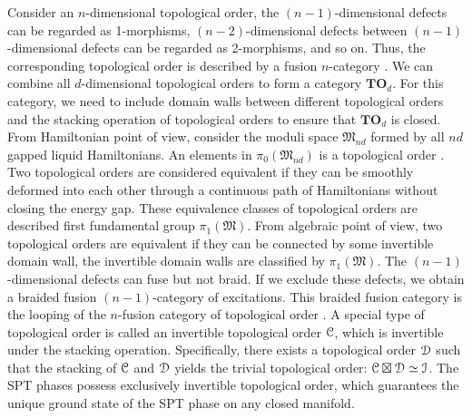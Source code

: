 \documentclass[a4paper,11pt]{article}
\theoremstyle{theorem}
\theoremstyle{remark}
\newcommand\eC           {\EuScript{C}}
\newcommand\eD           {\EuScript{D}}
\newcommand\eI           {\EuScript{I}}
\begin{document}
Consider an \( n \)-dimensional topological order,
the $(n-1)$-dimensional defects can be regarded as 1-morphisms, $(n-2)$-dimensional defects between $(n-1)$-dimensional defects can be regarded as 2-morphisms, and so on. Thus, the corresponding topological order is described by a fusion $n$-category \cite{kong2014braided,kong2017boundary,Kong2020algebraic,johnson2022classification}.
We can combine all $d$-dimensional topological orders to form a category $\mathbf{TO}_{d}$. For this category, we need to include domain walls between different topological orders and the stacking operation of topological orders to ensure that $\mathbf{TO}_{d}$ is closed.
From Hamiltonian point of view, consider the moduli space $\mathfrak{M}_{nd}$ formed by all $nd$ gapped liquid Hamiltonians. An elements in $\pi_0(\mathfrak{M}_{nd})$ is a topological order \cite{zeng2015quantum,Swingle2016,Hsin2023moduli}.
Two topological orders are considered equivalent if they can be smoothly deformed into each other through a continuous path of Hamiltonians without closing the energy gap.
These equivalence classes of topological orders are described first fundamental group $\pi_1(\mathfrak{M})$. From algebraic point of view, two topological orders are equivalent if they can be connected by some invertible domain wall, the invertible domain walls are classified by  $\pi_1(\mathfrak{M})$.
The $(n-1)$-dimensional defects can fuse but not braid. If we exclude these defects, we obtain a braided fusion $(n-1)$-category of excitations. This braided fusion category is the looping of the $n$-fusion category of topological order \cite{Kong2020algebraic,johnson2022classification}.
A special type of topological order is called an invertible topological order $\eC$, which is invertible under the stacking operation. Specifically, there exists a topological order $\eD$ such that the stacking of $\eC$ and $\eD$ yields the trivial topological order: $\eC \boxtimes \eD \simeq \eI$. The SPT phases possess exclusively invertible topological order, which guarantees the unique ground state of the SPT phase on any closed manifold.
\end{document}
